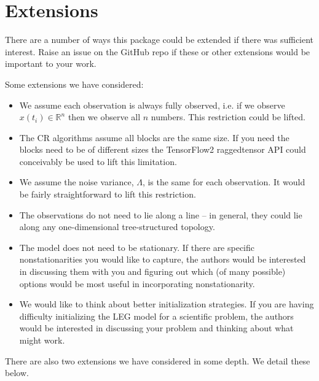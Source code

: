\documentclass{article}
\theoremstyle{definition}
\begin{document}
                                                        
\section{Extensions}

There are a number of ways this package could be extended if there was sufficient interest.   Raise an issue on the GitHub repo if these or other extensions would be important to your work.  

Some extensions we have considered:

\begin{itemize}
    \item We assume each observation is always fully observed, i.e. if we observe $x(t_i) \in \mathbb{R}^n$ then we observe all $n$ numbers.  This restriction could be lifted.
    \item The CR algorithms assume all blocks are the same size.  If you need the blocks need to be of different sizes the TensorFlow2 raggedtensor API could conceivably be used to lift this limitation.
    \item We assume the noise variance, $\Lambda$, is the same for each observation.  It would be fairly straightforward to lift this restriction.
    \item The observations do not need to lie along a line -- in general, they could lie along any one-dimensional tree-structured topology. 
    \item The model does not need to be stationary.  If there are specific nonstationarities you would like to capture, the authors would be interested in discussing them with you and figuring out which (of many possible) options would be most useful in incorporating nonstationarity.  
    \item We would like to think about better initialization strategies.  If you are having difficulty initializing the LEG model for a scientific problem, the authors would be interested in discussing your problem and thinking about what might work.
\end{itemize}

There are also two extensions we have considered in some depth.  We detail these below.
\end{document}
